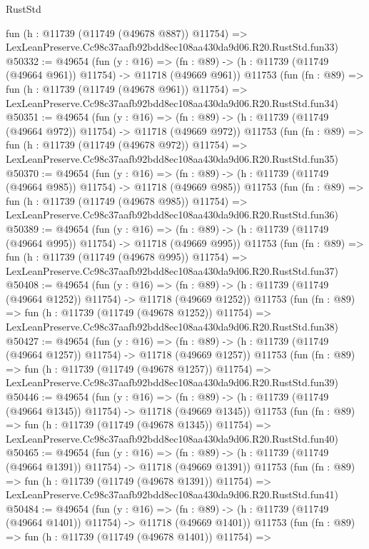 \begin{lexlean}{RustStd}
\begin{coremodule}
    fun (h : @11739 (@11749 (@49678 @887)) @11754) =>
    LexLeanPreserve.Cc98c37aafb92bdd8ec108aa430da9d06.R20.RustStd.fun33)
@50332 := @49654
    (fun (y : @16) =>
    (fn : @89) -> (h : @11739 (@11749 (@49664 @961)) @11754) -> @11718 (@49669 @961))
    @11753
    (fun (fn : @89) =>
    fun (h : @11739 (@11749 (@49678 @961)) @11754) =>
    LexLeanPreserve.Cc98c37aafb92bdd8ec108aa430da9d06.R20.RustStd.fun34)
@50351 := @49654
    (fun (y : @16) =>
    (fn : @89) -> (h : @11739 (@11749 (@49664 @972)) @11754) -> @11718 (@49669 @972))
    @11753
    (fun (fn : @89) =>
    fun (h : @11739 (@11749 (@49678 @972)) @11754) =>
    LexLeanPreserve.Cc98c37aafb92bdd8ec108aa430da9d06.R20.RustStd.fun35)
@50370 := @49654
    (fun (y : @16) =>
    (fn : @89) -> (h : @11739 (@11749 (@49664 @985)) @11754) -> @11718 (@49669 @985))
    @11753
    (fun (fn : @89) =>
    fun (h : @11739 (@11749 (@49678 @985)) @11754) =>
    LexLeanPreserve.Cc98c37aafb92bdd8ec108aa430da9d06.R20.RustStd.fun36)
@50389 := @49654
    (fun (y : @16) =>
    (fn : @89) -> (h : @11739 (@11749 (@49664 @995)) @11754) -> @11718 (@49669 @995))
    @11753
    (fun (fn : @89) =>
    fun (h : @11739 (@11749 (@49678 @995)) @11754) =>
    LexLeanPreserve.Cc98c37aafb92bdd8ec108aa430da9d06.R20.RustStd.fun37)
@50408 := @49654
    (fun (y : @16) =>
    (fn : @89) -> (h : @11739 (@11749 (@49664 @1252)) @11754) -> @11718 (@49669 @1252))
    @11753
    (fun (fn : @89) =>
    fun (h : @11739 (@11749 (@49678 @1252)) @11754) =>
    LexLeanPreserve.Cc98c37aafb92bdd8ec108aa430da9d06.R20.RustStd.fun38)
@50427 := @49654
    (fun (y : @16) =>
    (fn : @89) -> (h : @11739 (@11749 (@49664 @1257)) @11754) -> @11718 (@49669 @1257))
    @11753
    (fun (fn : @89) =>
    fun (h : @11739 (@11749 (@49678 @1257)) @11754) =>
    LexLeanPreserve.Cc98c37aafb92bdd8ec108aa430da9d06.R20.RustStd.fun39)
@50446 := @49654
    (fun (y : @16) =>
    (fn : @89) -> (h : @11739 (@11749 (@49664 @1345)) @11754) -> @11718 (@49669 @1345))
    @11753
    (fun (fn : @89) =>
    fun (h : @11739 (@11749 (@49678 @1345)) @11754) =>
    LexLeanPreserve.Cc98c37aafb92bdd8ec108aa430da9d06.R20.RustStd.fun40)
@50465 := @49654
    (fun (y : @16) =>
    (fn : @89) -> (h : @11739 (@11749 (@49664 @1391)) @11754) -> @11718 (@49669 @1391))
    @11753
    (fun (fn : @89) =>
    fun (h : @11739 (@11749 (@49678 @1391)) @11754) =>
    LexLeanPreserve.Cc98c37aafb92bdd8ec108aa430da9d06.R20.RustStd.fun41)
@50484 := @49654
    (fun (y : @16) =>
    (fn : @89) -> (h : @11739 (@11749 (@49664 @1401)) @11754) -> @11718 (@49669 @1401))
    @11753
    (fun (fn : @89) =>
    fun (h : @11739 (@11749 (@49678 @1401)) @11754) =>

\end{coremodule}
\end{lexlean}

